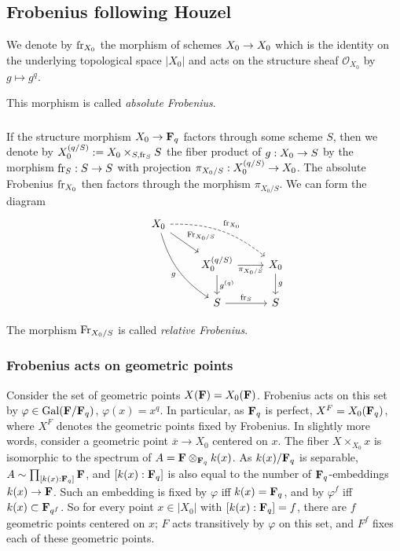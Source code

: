 \documentclass[deligne.tex]{subfiles}
\begin{document}
\subsection{Frobenius following Houzel}\label{sec:houz}
\begin{definition*}
We denote by $\operatorname{fr}_{X_0}$ the morphism of schemes $X_0\rightarrow X_0$ which is the 
identity on the underlying topological space $|X_0|$ and acts on the
structure sheaf $\mathscr O_{X_0}$ by $g\mapsto g^q$.

This morphism is called \emph{absolute Frobenius}.
\end{definition*}

\subsubsection{}\label{sec:relFrobDef}
If the structure morphism $X_0\rightarrow\mathbf{F}_q$ factors through some scheme $S$,
then we denote by
$X_0^{(q/S)}:=X_0\times_{S,\operatorname{fr}_S}S$ the fiber product of $g:X_0\rightarrow S$ by the morphism 
$\operatorname{fr}_S:S\rightarrow S$ with projection $\pi_{X_0/S}:X_0^{(q/S)}\rightarrow X_0$.
The absolute Frobenius $\operatorname{fr}_{X_0}$ then factors through the morphism $\pi_{X_0/S}$.
We can form the diagram
\begin{equation*}
\begin{tikzcd}
&X_0\arrow[dr,"\Fr_{X_0/S}"]\arrow[drr, dashed,"\fr_{X_0}",bend left=20]\arrow[ddr,"g"',bend right=20] \\
&&X_0^{(q/S)}\arrow[r,"\pi_{X_0/S}"']\arrow[d,"g^{(q)}"] &X_0\arrow[d,"g"] \\
&&S\arrow[r,"\fr_S"] &S
\end{tikzcd}
\end{equation*}
\begin{definition*}
    The morphism $\operatorname{Fr}_{X_0/S}$ is called \emph{relative Frobenius}.
\end{definition*}
\subsubsection{Frobenius acts on geometric points}
Consider the set of geometric points $X(\mathbf{F})=X_0(\mathbf{F})$.
Frobenius acts on this set by $\varphi\in\operatorname{Gal}(\mathbf{F}/\mathbf{F}_q)$,
$\varphi(x)=x^q$. In particular, as $\mathbf{F}_q$ is perfect, $X^F=X_0(\mathbf{F}_q)$, where
$X^F$ denotes the geometric points fixed by Frobenius. In slightly more words, consider
a geometric point $\overline x\rightarrow X_0$ centered on $x$. The fiber
$X\times_{X_0}x$ is isomorphic to the spectrum of $A=\mathbf{F}\otimes_{\mathbf{F}_q}k(x)$.
As $k(x)/\mathbf{F}_q$ is separable, $A\sim\prod_{[k(x):\mathbf{F}_q]}\mathbf{F}$, and $[k(x):\mathbf{F}_q]$ is also
equal to the number of $\mathbf{F}_q$-embeddings $k(x)\rightarrow\mathbf{F}$. Such an embedding is
fixed by $\varphi$ iff $k(x)=\mathbf{F}_q$, and by $\varphi^f$ iff $k(x)\subset \mathbf{F}_{q^f}$.
So for every point $x\in|X_0|$ with $[k(x):\mathbf{F}_q]=f$, there are $f$
geometric points centered on $x$; $F$ acts transitively by $\varphi$ on this set, and
$F^f$ fixes each of these geometric points.
\end{document}
